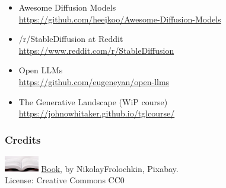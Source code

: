 \documentclass[17pt,aspectratio=169,hyperref={pdfusetitle,colorlinks,allcolors=olive}]{beamer}
\begin{document}
\begin{frame}[fragile]


  {\small
    \begin{itemize}
    \item Awesome Diffusion Models \\
      {\scriptsize \url{https://github.com/heejkoo/Awesome-Diffusion-Models}}
    \item /r/StableDiffusion at Reddit \\
      {\scriptsize \url{https://www.reddit.com/r/StableDiffusion}}
    \item Open LLMs \\
      \url{https://github.com/eugeneyan/open-llms}
    \item The Generative Landscape (WiP course) \\
      {\scriptsize \url{https://johnowhitaker.github.io/tglcourse/}}
    \end{itemize}
  }  
\end{frame}

\begin{frame}[fragile]
  \frametitle{Credits}

  \includegraphics[width=1.5cm]{figs/bookpages}
  {\small \href{https://pixabay.com/en/book-reading-library-literature-1261800/}{Book}, by NikolayFrolochkin, Pixabay. \\ License: Creative Commons CC0\\}

\end{frame}
\end{document}
